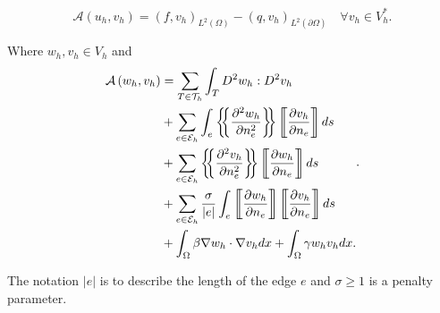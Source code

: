\begin{equation}
\label{eq:C0-methoda}
\mathcal{A} \left( u_{h}, v_{h}  \right) = \left( f, v_{h} \right)_{L^{2}\left( \Omega  \right)} - \left( q, v_{h}
\right) _{L^{2}\left( \partial \Omega  \right)} \quad  \forall v_{h} \in V_{h}^{*}
.\end{equation}

Where $w_{h}, v_{h} \in  V_{h}$ and
\begin{equation}
\label{eq:C0-methodb}
\begin{split}
    \mathcal{A} \left( w_{h}, v_{h} \right) &=  \sum_{T \in \mathcal{T} _{h}}^{} \int_{T}^{} D^2 w_{h} : D^2 v_{h}  \\
    & + \sum_{e \in  \mathcal{E} _{h}}^{} \int_{e}^{ } \mean{ \frac{\partial ^2 w _{h}}{\partial n_{e}^2 } } \jump{
    \frac{\partial v_{h}}{\partial  n_{e}} }  ds \\
    & + \sum_{e \in \mathcal{E} _{h}}^{} \mean{ \frac{\partial ^2
v_{h}}{\partial n_{e }^2 } } \jump{ \frac{\partial w_{h}}{\partial n_{e}} }  ds \\
 &  + \sum_{e \in \mathcal{E} _{h}}^{} \frac{\sigma }{\left\lvert e \right\rvert } \int_{e}^{} \jump{ \frac{\partial
 w_{h}}{\partial n_{e}}} \jump{ \frac{\partial v_{h}}{\partial n_{e}} } ds \\
 & + \int_{\Omega }^{}  \beta \nabla w_{h} \cdot \nabla v_{h} dx + \int_{\Omega }^{} \gamma w_{h} v_{h} dx .
\end{split}
.\end{equation}

The notation $\left\lvert e \right\rvert $ is to describe the length of the edge $e$ and $\sigma  \ge  1$ is a penalty
parameter.

